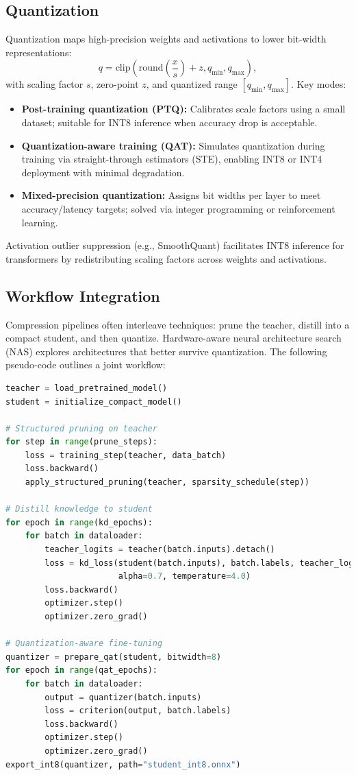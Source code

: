 \documentclass{article}
\begin{document}
\subsection{Quantization}
Quantization maps high-precision weights and activations to lower bit-width representations:
\begin{equation}
  q = \mathrm{clip}\left(\mathrm{round}\left(\frac{x}{s}\right) + z, q_{\min}, q_{\max}\right),
\end{equation}
with scaling factor $s$, zero-point $z$, and quantized range $[q_{\min}, q_{\max}]$. Key modes:
\begin{itemize}
  \item \textbf{Post-training quantization (PTQ):} Calibrates scale factors using a small dataset; suitable for INT8 inference when accuracy drop is acceptable.
  \item \textbf{Quantization-aware training (QAT):} Simulates quantization during training via straight-through estimators (STE), enabling INT8 or INT4 deployment with minimal degradation.
  \item \textbf{Mixed-precision quantization:} Assigns bit widths per layer to meet accuracy/latency targets; solved via integer programming or reinforcement learning.
\end{itemize}
Activation outlier suppression (e.g., SmoothQuant) facilitates INT8 inference for transformers by redistributing scaling factors across weights and activations.

\subsection{Workflow Integration}
Compression pipelines often interleave techniques: prune the teacher, distill into a compact student, and then quantize. Hardware-aware neural architecture search (NAS) explores architectures that better survive quantization. The following pseudo-code outlines a joint workflow:

\begin{lstlisting}[language=Python, caption={Combined pruning, distillation, and quantization-aware training.}]
teacher = load_pretrained_model()
student = initialize_compact_model()

# Structured pruning on teacher
for step in range(prune_steps):
    loss = training_step(teacher, data_batch)
    loss.backward()
    apply_structured_pruning(teacher, sparsity_schedule(step))

# Distill knowledge to student
for epoch in range(kd_epochs):
    for batch in dataloader:
        teacher_logits = teacher(batch.inputs).detach()
        loss = kd_loss(student(batch.inputs), batch.labels, teacher_logits,
                       alpha=0.7, temperature=4.0)
        loss.backward()
        optimizer.step()
        optimizer.zero_grad()

# Quantization-aware fine-tuning
quantizer = prepare_qat(student, bitwidth=8)
for epoch in range(qat_epochs):
    for batch in dataloader:
        output = quantizer(batch.inputs)
        loss = criterion(output, batch.labels)
        loss.backward()
        optimizer.step()
        optimizer.zero_grad()
export_int8(quantizer, path="student_int8.onnx")
\end{lstlisting}
\end{document}
